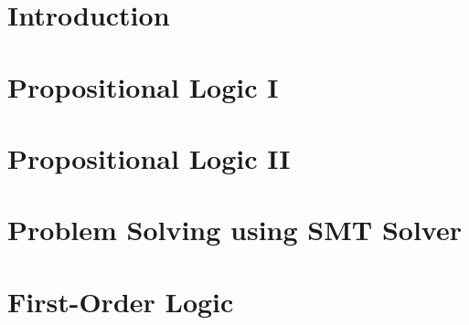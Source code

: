 \documentclass[12pt,openany]{book}
\begin{document}
	
	
	\tableofcontents
	\newpage
	
	\newpage
	\chapter{Introduction}
	
	
	\newpage
%	
	
	\newpage
	\chapter{Propositional Logic I}
	
	
	\newpage
	\chapter{Propositional Logic II}
	
	
	\newpage
	\chapter{Problem Solving using SMT Solver}
	
	
	\newpage
	\chapter{First-Order Logic}
	
	
	
%	
	
%	
	
%	
	
	
	
	
\end{document}
